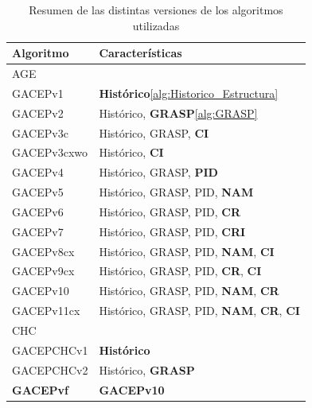 \begin{table}[h]
\begin{tabular}{|l|l|}
\hline
\rowcolor[HTML]{FFFFC7} 
Algoritmo        & Características                    \\ \hline
\rowcolor[HTML]{F7EAC7} 
AGE              &                                    \\ \hline
\rowcolor[HTML]{DAE8FC} 
GACEPv1          & \textbf{Histórico}\ref{alg:Historico_Estructura}                 \\ \hline
\rowcolor[HTML]{DDFDFF} 
GACEPv2          & Histórico, \textbf{GRASP}\ref{alg:GRASP}                   \\ \hline
\rowcolor[HTML]{DAE8FC} 
GACEPv3c         & Histórico, GRASP, \textbf{CI}               \\ \hline
\rowcolor[HTML]{DDFDFF} 
GACEPv3cxwo      & Histórico, \textbf{CI}                      \\ \hline
\rowcolor[HTML]{DAE8FC} 
GACEPv4          & Histórico, GRASP, \textbf{PID}              \\ \hline
\rowcolor[HTML]{DDFDFF} 
GACEPv5          & Histórico, GRASP, PID, \textbf{NAM}         \\ \hline
\rowcolor[HTML]{DAE8FC} 
GACEPv6          & Histórico, GRASP, PID, \textbf{CR}          \\ \hline
\rowcolor[HTML]{DDFDFF} 
GACEPv7          & Histórico, GRASP, PID, \textbf{CRI}         \\ \hline
\rowcolor[HTML]{DAE8FC} 
GACEPv8cx        & Histórico, GRASP, PID, \textbf{NAM}, \textbf{CI}     \\ \hline
\rowcolor[HTML]{DDFDFF} 
GACEPv9cx        & Histórico, GRASP, PID, \textbf{CR}, \textbf{CI}      \\ \hline
\rowcolor[HTML]{DAE8FC} 
GACEPv10         & Histórico, GRASP, PID, \textbf{NAM}, \textbf{CR}     \\ \hline
\rowcolor[HTML]{DDFDFF} 
GACEPv11cx       & Histórico, GRASP, PID, \textbf{NAM}, \textbf{CR}, \textbf{CI} \\ \hline
\rowcolor[HTML]{F7EAC7} 
CHC              &                                    \\ \hline
\rowcolor[HTML]{DAE8FC} 
GACEPCHCv1       & \textbf{Histórico}                 \\ \hline
\rowcolor[HTML]{DDFDFF} 
GACEPCHCv2       & Histórico, \textbf{GRASP}                   \\ \hline
\rowcolor[HTML]{F7EAC7} 
\textbf{GACEPvf} & \textbf{GACEPv10}                  \\ \hline
\end{tabular}
\caption{\label{ResumenVersiones}Resumen de las distintas versiones de los algoritmos utilizadas}
\end{table}

